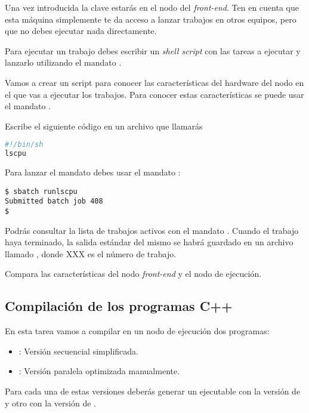 Una vez introducida la clave estarás en el nodo del \emph{front-end}.
Ten en cuenta que esta máquina simplemente te da acceso a lanzar trabajos
en otros equipos, pero que no debes ejecutar nada directamente.

Para ejecutar un trabajo debes escribir un \emph{shell script} con las tareas
a ejecutar y lanzarlo utilizando el mandato .

Vamos a crear un script para conocer las características del hardware del nodo
en el que vas a ejecutar los trabajos. Para conocer estas características
se puede usar el mandato . 

Escribe el siguiente código en un archivo que llamarás 

\begin{lstlisting}[language=sh]
#!/bin/sh
lscpu
\end{lstlisting}

Para lanzar el mandato debes usar el mandato :

\begin{lstlisting}[style=terminal]
$ sbatch runlscpu
Submitted batch job 408
$
\end{lstlisting}

Podrás consultar la lista de trabajos activos con el mandato .
Cuando el trabajo haya terminado, la salida estándar del mismo se habrá guardado
en un archivo llamado , donde XXX es el número de trabajo.

Compara las características del nodo \emph{front-end} y el nodo de ejecución.

\subsection{Compilación de los programas C++}

En esta tarea vamos a compilar en un nodo de ejecución dos programas:

\begin{itemize}
  \item {}: Versión secuencial simplificada.
  \item {}: Versión paralela optimizada manualmente.
\end{itemize}

Para cada una de estas versiones deberás generar un ejecutable con la versión de 
 y otro con la versión de .

